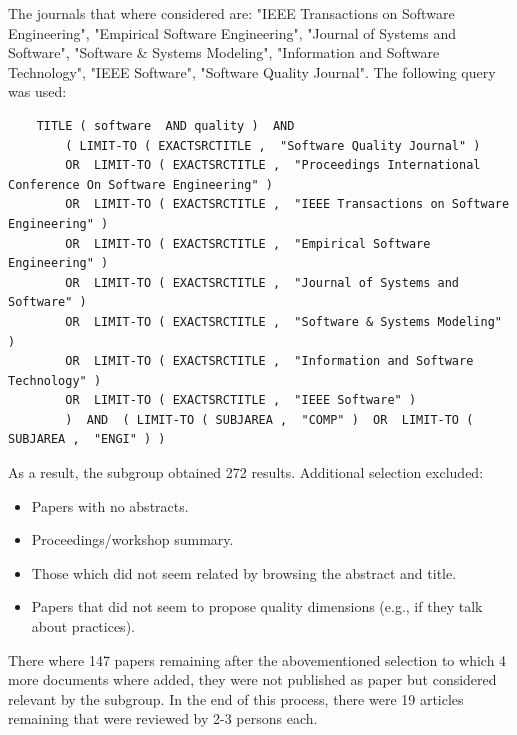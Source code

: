 The journals that where considered are: "IEEE Transactions on Software Engineering", "Empirical Software Engineering", "Journal of Systems and Software", "Software \& Systems Modeling", "Information and Software Technology", "IEEE Software", "Software Quality Journal". The following query was used:

\tiny
\begin{verbatim}
    TITLE ( software  AND quality )  AND  
        ( LIMIT-TO ( EXACTSRCTITLE ,  "Software Quality Journal" )  
        OR  LIMIT-TO ( EXACTSRCTITLE ,  "Proceedings International Conference On Software Engineering" ) 
        OR  LIMIT-TO ( EXACTSRCTITLE ,  "IEEE Transactions on Software Engineering" )
        OR  LIMIT-TO ( EXACTSRCTITLE ,  "Empirical Software Engineering" ) 
        OR  LIMIT-TO ( EXACTSRCTITLE ,  "Journal of Systems and Software" ) 
        OR  LIMIT-TO ( EXACTSRCTITLE ,  "Software & Systems Modeling" ) 
        OR  LIMIT-TO ( EXACTSRCTITLE ,  "Information and Software Technology" )  
        OR  LIMIT-TO ( EXACTSRCTITLE ,  "IEEE Software" )   
        )  AND  ( LIMIT-TO ( SUBJAREA ,  "COMP" )  OR  LIMIT-TO ( SUBJAREA ,  "ENGI" ) )  
\end{verbatim}
\small

As a result, the subgroup obtained 272 results. Additional selection excluded:

\begin{itemize}
    \item Papers with no abstracts.
    \item Proceedings/workshop summary.
    \item Those which did not seem related by browsing the abstract and title.
    \item Papers that did not seem to propose quality dimensions (e.g., if they talk about practices).
\end{itemize}

There where 147 papers remaining after the abovementioned selection to which 4 more documents where added, they were not published as paper but considered relevant by the subgroup. In the end of this process, there were 19 articles remaining that were reviewed by 2-3 persons each.



